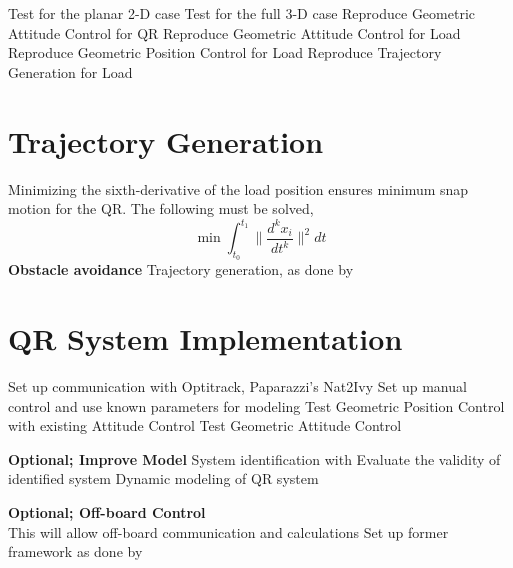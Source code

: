 \begin{outline}
	\2 Test for the planar 2-D case 
	\2 Test for the full 3-D case	
	\3 Reproduce Geometric Attitude Control	for QR	
	\3 Reproduce Geometric Attitude Control	for Load	
	\3 Reproduce Geometric Position Control	for Load						
	\3 Reproduce Trajectory Generation for Load
		
\section{Trajectory Generation}
Minimizing the sixth-derivative of the load position ensures minimum snap motion for the QR. The following must be solved,
\begin{equation}\label{key}
\min \int_{t_0}^{t_1}\parallel\frac{d^kx_i}{dt^k}\parallel^2dt
\end{equation}
\1 \textbf{Obstacle avoidance}
\2 Trajectory generation, as done by \cite{Tang2015}
\end{outline}				


\section{QR System Implementation}		
\begin{outline}
\1 Set up communication with Optitrack, Paparazzi's Nat2Ivy
\1 Set up manual control and use known  parameters for modeling
\1 Test Geometric Position Control with existing Attitude Control 
\1 Test Geometric Attitude Control				

\1 \textbf{Optional; Improve Model}
\2 System identification with \textbf{}\cite{Smeur2015,Smeur2016}
\2 Evaluate the validity of identified system
\2 Dynamic modeling of QR system				

\1 \textbf{Optional; Off-board Control }\\
This will allow off-board communication and calculations				
\2 Set up former framework as done by \cite{PraveenThesis}
\end{outline}